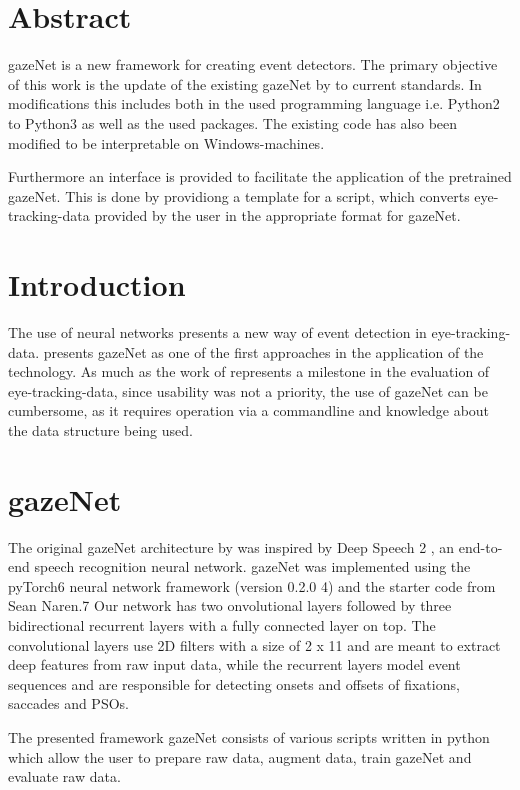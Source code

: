 \documentclass{article}
\begin{document}
\section{Abstract}
gazeNet is a new framework for creating event detectors. The primary objective of this work is the update of the existing gazeNet by \citet{zemblys2018gazeNet} to current standards. In modifications this includes both in the used programming language i.e. Python2 to Python3 as well as the used packages. The existing code has also been modified to be interpretable on Windows-machines.

Furthermore an interface is provided to facilitate the application of the pretrained gazeNet. This is done by providiong a template for a script, which converts eye-tracking-data provided by the user in the appropriate format for gazeNet.


\section{Introduction}
The use of neural networks presents a new way of event detection in eye-tracking-data. \citet{zemblys2018gazeNet} presents gazeNet as one of the first approaches in the application of the technology. As much as the work of \citet*{zemblys2018gazeNet} represents a milestone in the evaluation of eye-tracking-data, since usability was not a priority, the use of gazeNet can be cumbersome, as it requires operation via a commandline and knowledge about the data structure being used.


\section{gazeNet}
The original gazeNet architecture by \citet{zemblys2018gazeNet} was inspired by Deep Speech 2 \citeauthor{deep_speech_2}, an end-to-end speech recognition neural network. gazeNet was implemented using the pyTorch6 neural network framework (version 0.2.0 4) and the starter code from Sean Naren.7 Our network has two onvolutional layers followed by three bidirectional recurrent layers with a fully connected layer on top. The convolutional layers use 2D filters with a size of 2 x 11 and are meant to extract deep features from raw input data, while the recurrent layers model event sequences and are responsible for detecting onsets and offsets of fixations, saccades and PSOs. \citet{zemblys2018gazeNet}

The presented framework gazeNet consists of various scripts written in python which allow the user to prepare raw data, augment data, train gazeNet and evaluate raw data.
\end{document}
